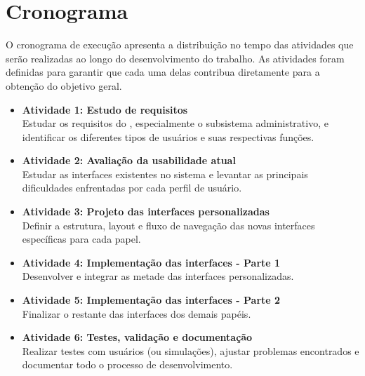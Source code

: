 \section{Cronograma}
\label{sec-intro-crono}

O cronograma de execução apresenta a distribuição no tempo das atividades que serão realizadas ao longo do desenvolvimento do trabalho. As atividades foram definidas para garantir que cada uma delas contribua diretamente para a obtenção do objetivo geral.

\begin{itemize}
	\item \textbf{Atividade 1: Estudo de requisitos} \\
	Estudar os requisitos do \cite{requisitos_marvin_core}, especialmente o subsistema administrativo, e identificar os diferentes tipos de usuários e suas respectivas funções.
	
	\item \textbf{Atividade 2: Avaliação da usabilidade atual} \\
	Estudar as interfaces existentes no sistema e levantar as principais dificuldades enfrentadas por cada perfil de usuário.
	
	\item \textbf{Atividade 3: Projeto das interfaces personalizadas} \\
	Definir a estrutura, layout e fluxo de navegação das novas interfaces específicas para cada papel.
	
	\item \textbf{Atividade 4: Implementação das interfaces - Parte 1} \\
	Desenvolver e integrar as metade das interfaces personalizadas.
	
	\item \textbf{Atividade 5: Implementação das interfaces - Parte 2} \\
	Finalizar o restante das interfaces dos demais papéis.
	
	\item \textbf{Atividade 6: Testes, validação e documentação} \\
	Realizar testes com usuários (ou simulações), ajustar problemas encontrados e documentar todo o processo de desenvolvimento.
\end{itemize}

